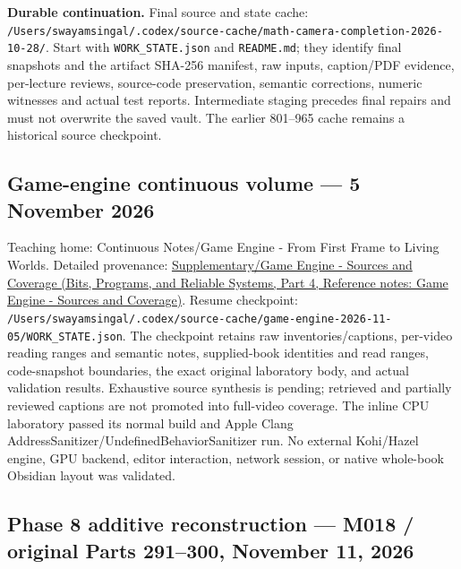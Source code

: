 \textbf{Durable continuation.} Final source and state cache: \texttt{/Users/swayamsingal/.codex/source-cache/math-camera-completion-2026-10-28/}. Start with \texttt{WORK\_STATE.json} and \texttt{README.md}; they identify final snapshots and the artifact SHA-256 manifest, raw inputs, caption/PDF evidence, per-lecture reviews, source-code preservation, semantic corrections, numeric witnesses and actual test reports. Intermediate staging precedes final repairs and must not overwrite the saved vault. The earlier 801--965 cache remains a historical source checkpoint.

\subsection{Game-engine continuous volume --- 5 November 2026}\label{appendix-a103e7846d21-game-engine-continuous-volume-5-november-2026}

\hypertarget{appendix-a103e7846d21-game-engine-continuous-volume-5-november-2026}{}

Teaching home: {Continuous Notes/Game Engine - From First Frame to Living Worlds}. Detailed provenance: \href{../01-Bits-Programs-and-Reliable-Systems-P04/main.pdf\#nameddest=appendix-877738f6f4d2}{Supplementary/Game Engine - Sources and Coverage (Bits, Programs, and Reliable Systems, Part 4, Reference notes: Game Engine - Sources and Coverage)}. Resume checkpoint: \texttt{/Users/swayamsingal/.codex/source-cache/game-engine-2026-11-05/WORK\_STATE.json}. The checkpoint retains raw inventories/captions, per-video reading ranges and semantic notes, supplied-book identities and read ranges, code-snapshot boundaries, the exact original laboratory body, and actual validation results. Exhaustive source synthesis is pending; retrieved and partially reviewed captions are not promoted into full-video coverage. The inline CPU laboratory passed its normal build and Apple Clang AddressSanitizer/UndefinedBehaviorSanitizer run. No external Kohi/Hazel engine, GPU backend, editor interaction, network session, or native whole-book Obsidian layout was validated.

\subsection{Phase 8 additive reconstruction --- M018 / original Parts 291--300, November 11, 2026}\label{appendix-a103e7846d21-phase-8-additive-reconstruction-m018-original-parts-291300-november-11-2026}

\hypertarget{appendix-a103e7846d21-phase-8-additive-reconstruction-m018-original-parts-291300-november-11-2026}{}

